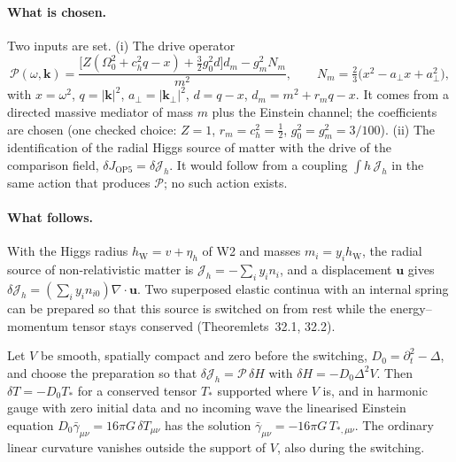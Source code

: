\paragraph{What is chosen.}
Two inputs are set.  (i) The drive operator
\begin{equation}
 \mathcal P(\omega,\mathbf k)=\frac{\bigl[Z(\Omega_0^2+c_h^2q-x)+\tfrac32g_0^2d\bigr]d_m-g_m^2N_m}{m^2},
 \qquad N_m=\tfrac23\bigl(x^2-a_\perp x+a_\perp^2\bigr),
 \label{eq:lop5-drive}
\end{equation}
with $x=\omega^2$, $q=|\mathbf k|^2$, $a_\perp=|\mathbf k_\perp|^2$, $d=q-x$, $d_m=m^2+r_mq-x$.  It comes from a directed massive mediator of mass
$m$ plus the Einstein channel; the coefficients are chosen (one checked choice: $Z=1$, $r_m=c_h^2=\tfrac12$, $g_0^2=g_m^2=3/100$).
(ii) The identification of the radial Higgs source of matter with the drive of the comparison field, $\delta J_{\mathrm{OP5}}=\delta\mathcal J_h$.  It would
follow from a coupling $\int h\,\mathcal J_h$ in the same action that produces $\mathcal P$; no such action exists.

\paragraph{What follows.}
With the Higgs radius $h_{\mathrm W}=v+\eta_h$ of W2 and masses $m_i=y_ih_{\mathrm W}$, the radial source of non-relativistic matter is
$\mathcal J_h=-\sum_iy_in_i$, and a displacement $\mathbf u$ gives $\delta\mathcal J_h=(\sum_iy_in_{i0})\nabla\cdot\mathbf u$.  Two superposed elastic
continua with an internal spring can be prepared so that this source is switched on from rest while the energy--momentum tensor stays conserved
(Theoremlets~32.1, 32.2).

\begin{proposition}
\label{prop:lop5-compact}
Let $V$ be smooth, spatially compact and zero before the switching, $D_0=\partial_t^2-\Delta$, and choose the preparation so that
$\delta\mathcal J_h=\mathcal P\,\delta H$ with $\delta H=-D_0\Delta^2V$.  Then $\delta T=-D_0T_*$ for a conserved tensor $T_*$ supported where $V$ is,
and in harmonic gauge with zero initial data and no incoming wave the linearised Einstein equation $D_0\bar\gamma_{\mu\nu}=16\pi G\,\delta T_{\mu\nu}$
has the solution $\bar\gamma_{\mu\nu}=-16\pi G\,T_{*,\mu\nu}$.  The ordinary linear curvature vanishes outside the support of $V$, also during
the switching.
\end{proposition}

